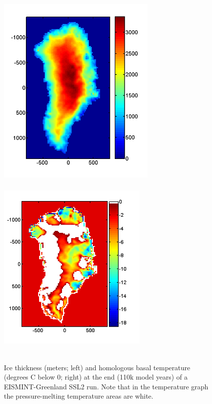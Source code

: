 \documentclass[11pt,final]{amsart}
\begin{document}
\begin{figure}[ht]
\includegraphics[height=3.7in,keepaspectratio=true]{figs/greenH_SSL2}\qquad\includegraphics[height=3.7in,width=2.9in]{figs/greenThomol_SSL2}
\caption{Ice thickness (meters; left) and homologous basal temperature (degrees C below 0; right) at the end (110k model years) of a EISMINT-Greenland SSL2 run.  Note that in the temperature graph the pressure-melting temperature areas are white.}
\label{fig:ssl2thickThomol}
\end{figure}
\end{document}
